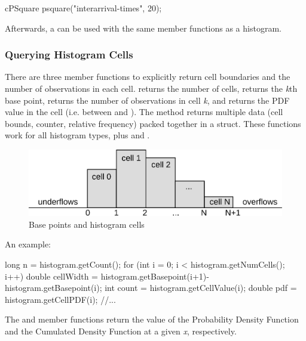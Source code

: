 \begin{cpp}
cPSquare psquare("interarrival-times", 20);
\end{cpp}

Afterwards, a  can be used with the same member functions
as a histogram.


\subsubsection{Querying Histogram Cells}

There are three member functions to explicitly return cell boundaries
and the number of observations in each cell.  returns
the number of cells,  returns the
\textit{k}th base point,  returns the
number of observations in cell \textit{k}, and
 returns the PDF value in the cell
(i.e. between  and
).
The  method returns multiple data
(cell bounds, counter, relative frequency) packed together in a struct.
These functions work for all histogram types, plus 
and .

\begin{figure}[htbp]
  \begin{center}
    \includegraphics{figures/simlib-histogramcells}
    \caption{Base points and histogram cells}
  \end{center}
\end{figure}

An example:

\begin{cpp}
long n = histogram.getCount();
for (int i = 0; i < histogram.getNumCells(); i++) {
  double cellWidth = histogram.getBasepoint(i+1)-histogram.getBasepoint(i);
  int count = histogram.getCellValue(i);
  double pdf = histogram.getCellPDF(i);
  //...
}
\end{cpp}


The  and  member functions
return the value of the Probability Density Function and the Cumulated
Density Function at a given \textit{x}, respectively.


